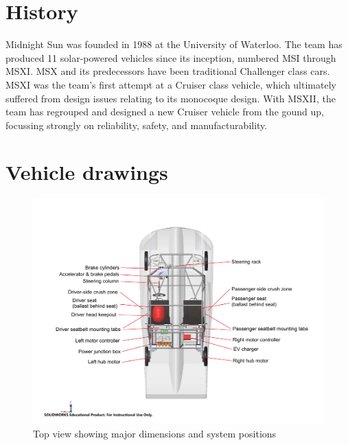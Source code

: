 \documentclass[10pt]{article}
\begin{document}


\section{History}
Midnight Sun was founded in 1988 at the University of Waterloo. The team has produced 11 solar-powered vehicles since its inception, numbered MSI through MSXI. MSX and its predecessors have been traditional Challenger class cars. MSXI was the team's first attempt at a Cruiser class vehicle, which ultimately suffered from design issues relating to its monocoque design. With MSXII, the team has regrouped and designed a new Cruiser vehicle from the gound up, focussing strongly on reliability, safety, and manufacturability.

\section{Vehicle drawings}
\begin{figure}[H]
\centering
\includegraphics[width=\textwidth]{figures/msxii-top-view-annotated}
\caption{Top view showing major dimensions and system positions}
\label{fig:msxii-top-view-annotated}
\end{figure}
\end{document}
